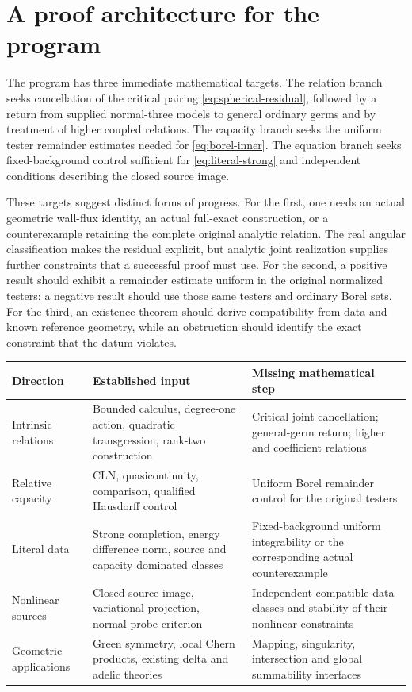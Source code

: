 \documentclass[11pt,a4paper]{article}
\newcommand{\MathEqref}[1]{{\hypersetup{linkcolor=EquationLink}\eqref{#1}}}
\theoremstyle{definition}
\theoremstyle{remark}
\numberwithin{equation}{section}
\begin{document}
\section{A proof architecture for the program}
\label{sec:architecture}

The program has three immediate mathematical targets.  The relation
branch seeks cancellation of the critical pairing
\MathEqref{eq:spherical-residual}, followed by a return from supplied
normal-three models to general ordinary germs and by treatment of
higher coupled relations.  The capacity branch seeks the uniform
tester remainder estimates needed for
\MathEqref{eq:borel-inner}.  The equation branch seeks fixed-background
control sufficient for \MathEqref{eq:literal-strong} and independent
conditions describing the closed source image.

These targets suggest distinct forms of progress.  For the first,
one needs an actual geometric wall-flux identity, an actual full-exact
construction, or a counterexample retaining the complete original
analytic relation.  The real angular classification makes the
residual explicit, but analytic joint realization supplies further
constraints that a successful proof must use.  For the second, a
positive result should exhibit a remainder estimate uniform in the
original normalized testers; a negative result should use those same
testers and ordinary Borel sets.  For the third, an existence theorem
should derive compatibility from data and known reference geometry,
while an obstruction should identify the exact constraint that the
datum violates.

\begin{center}
\small
\begin{tabular}{@{}p{}p{}p{}@{}}
\toprule
Direction & Established input & Missing mathematical step\\
\midrule
Intrinsic relations & Bounded calculus, degree-one action,
quadratic transgression, rank-two construction & Critical joint
cancellation; general-germ return; higher and coefficient relations\\[4pt]
Relative capacity & CLN, quasicontinuity, comparison,
qualified Hausdorff control & Uniform Borel remainder control for
the original testers\\[4pt]
Literal data & Strong completion, energy difference norm,
source and capacity dominated classes & Fixed-background uniform
integrability or the corresponding actual counterexample\\[4pt]
Nonlinear sources & Closed source image, variational projection,
normal-probe criterion & Independent compatible data classes and
stability of their nonlinear constraints\\[4pt]
Geometric applications & Green symmetry, local Chern products,
existing delta and adelic theories & Mapping, singularity,
intersection and global summability interfaces\\
\bottomrule
\end{tabular}
\end{center}
\end{document}
